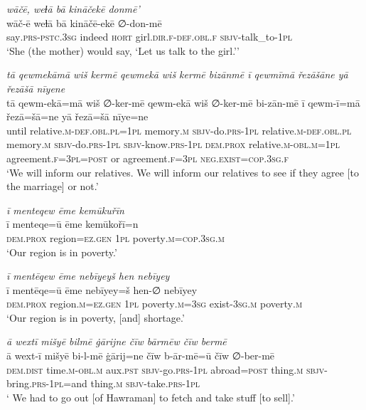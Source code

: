 \ea \label{ŽE.76}
\textit{wāčē, weɫā bā kināčekē donmē’} \\ 
\gll wāč-ē weɫā bā kināčē-ekē ∅-don-mē \\ 
 say\textsc{.prs-pstc}\textsc{.3sg} indeed \textsc{hort} girl\textsc{.dir}\textsc{.f}\textsc{-def}\textsc{.obl}\textsc{.f} \textsc{sbjv-}talk\_to\textsc{-1pl} \\ 
\glt `She (the mother) would say, ‘Let us talk to the girl.’'
\z 
 
\ea \label{ŽE.83}
\textit{tā qewmekāmā wiš kermē qewmekā wiš kermē bizānmē ī qewmīmā řezāšāne yā řezāšā nīyene} \\ 
\gll tā qewm-ekā=mā wiš ∅-ker-mē qewm-ekā wiš ∅-ker-mē bi-zān-mē ī qewm-ī=mā řezā=šā=ne yā řezā=šā nīye=ne \\ 
 until relative\textsc{.m}\textsc{-def}\textsc{.obl}\textsc{.pl}\textsc{=1pl} memory\textsc{.m} \textsc{sbjv-}do\textsc{.prs}\textsc{-1pl} relative\textsc{.m}\textsc{-def}\textsc{.obl}\textsc{.pl} memory\textsc{.m} \textsc{sbjv-}do\textsc{.prs}\textsc{-1pl} \textsc{sbjv-}know\textsc{.prs}\textsc{-1pl} \textsc{dem.prox} relative\textsc{.m}\textsc{-obl}\textsc{.m}\textsc{=1pl} agreement\textsc{.f}\textsc{=3pl}\textsc{=\textsc{post}} or agreement\textsc{.f}\textsc{=3pl} \textsc{\textsc{neg.}exist}\textsc{=cop}\textsc{.3sg}\textsc{.f} \\ 
\glt `We will inform our relatives. We will inform our relatives to see if they agree [to the  marriage] or not.'
\z 
 
\ea \label{ŽM.19}
\textit{ī menteqew ēme kemūkuřīn} \\ 
\gll ī menteqe=ū ēme kemūkořī=n \\ 
 \textsc{dem.prox} region\textsc{=ez.gen} \textsc{1pl} poverty\textsc{.m}\textsc{=cop}\textsc{.3sg}\textsc{.m} \\ 
\glt `Our region is in poverty.'
\z 
 
\ea \label{ŽM.21}
\textit{ī mentēqew ēme nebīyeyš hen nebīyey} \\ 
\gll ī mentēqe=ū ēme nebīyey=š hen-∅ nebīyey \\ 
 \textsc{dem.prox} region\textsc{.m}\textsc{=ez.gen} \textsc{1pl} poverty\textsc{.m}\textsc{=3sg} exist\textsc{-3sg}\textsc{.m} poverty\textsc{.m} \\ 
\glt `Our region is in poverty, [and] shortage.'
\z 
 
\ea \label{ŽM.22}
\textit{ā wextī mišyē bilmē ġārijne čīw bārmēw čīw bermē} \\ 
\gll ā wext-ī mišyē bi-l-mē ġārij=ne čīw b-ār-mē=ū čīw ∅-ber-mē \\ 
 \textsc{dem.dist} time\textsc{.m}\textsc{-obl}\textsc{.m} aux\textsc{.pst} \textsc{sbjv-}go\textsc{.prs}\textsc{-\textsc{1pl}} abroad\textsc{=\textsc{post}} thing\textsc{.m} \textsc{sbjv-}bring\textsc{.prs}\textsc{-\textsc{1pl}}=and thing\textsc{.m} \textsc{sbjv-}take\textsc{.prs}\textsc{-\textsc{1pl}} \\ 
\glt ` We had to go out [of Hawraman] to fetch and take stuff [to sell].'
\z 
 
